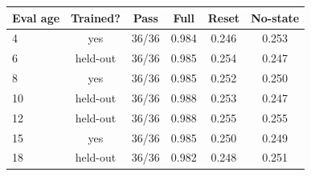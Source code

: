 \begin{tabular}{lccccc}
\toprule
Eval age & Trained? & Pass & Full & Reset & No-state\\
\midrule
4 & yes & 36/36 & 0.984 & 0.246 & 0.253\\
6 & held-out & 36/36 & 0.985 & 0.254 & 0.247\\
8 & yes & 36/36 & 0.985 & 0.252 & 0.250\\
10 & held-out & 36/36 & 0.988 & 0.253 & 0.247\\
12 & held-out & 36/36 & 0.988 & 0.255 & 0.255\\
15 & yes & 36/36 & 0.985 & 0.250 & 0.249\\
18 & held-out & 36/36 & 0.982 & 0.248 & 0.251\\
\bottomrule
\end{tabular}
